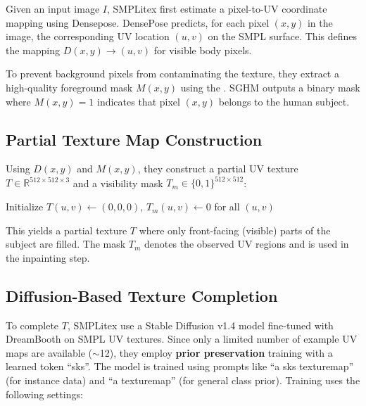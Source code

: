 Given an input image $I$, SMPLitex first estimate a pixel-to-UV coordinate mapping using Densepose\cite{wu2019detectron2}. DensePose predicts, for each pixel $(x, y)$ in the image, the corresponding UV location $(u, v)$ on the SMPL surface. This defines the mapping $D(x, y) \rightarrow (u, v)$ for visible body pixels.

To prevent background pixels from contaminating the texture, they extract a high-quality foreground mask $M(x, y)$ using the  \cite{chen2022sghm}. \ac{SGHM} outputs a binary mask where $M(x, y) = 1$ indicates that pixel $(x, y)$ belongs to the human subject.

\subsection{Partial Texture Map Construction}

Using $D(x,y)$ and $M(x,y)$, they construct a partial UV texture $T \in \mathbb{R}^{512 \times 512 \times 3}$ and a visibility mask $T_m \in \{0,1\}^{512 \times 512}$:

\begin{algorithm}[H]
\caption{Partial UV Texture Projection}
\label{alg:smplitex_partial_texture}
\DontPrintSemicolon
{}
Initialize $T(u,v)\gets(0,0,0)$, $T_m(u,v)\gets 0$ for all $(u,v)$\;
\end{algorithm}

This yields a partial texture $T$ where only front-facing (visible) parts of the subject are filled. The mask $T_m$ denotes the observed UV regions and is used in the inpainting step.

\subsection{Diffusion-Based Texture Completion}

To complete $T$, SMPLitex use a Stable Diffusion v1.4 model fine-tuned with DreamBooth on SMPL UV textures. Since only a limited number of example UV maps are available ($\sim$12), they employ \textbf{prior preservation} training with a learned token ``sks''. The model is trained using prompts like ``a sks texturemap'' (for instance data) and ``a texturemap'' (for general class prior). Training uses the following settings:

